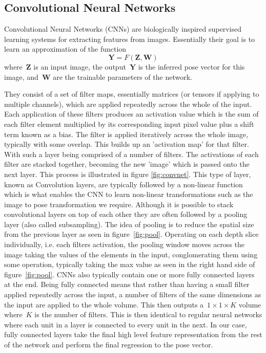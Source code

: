 \documentclass[11pt]{article} %
\begin{document}


\subsection{Convolutional Neural Networks}

Convolutional Neural Networks (CNNs) are biologically inspired supervised learning systems for extracting features from images. Essentially their goal is to learn an approximation of the function
\begin{equation}
\boldsymbol{Y} = F(\boldsymbol{Z},\boldsymbol{W})
\label{eq:networkF}
\end{equation}
where~$\boldsymbol{Z}$ is an input image, the output~$\boldsymbol{Y}$ is the inferred pose vector for this image, and~$\boldsymbol{W}$ are the trainable parameters of the network. 
 
They consist of a set of filter maps, essentially matrices (or tensors if applying to multiple channels), which are applied repeatedly across the whole of the input. Each application of these filters produces an activation value which is the sum of each filter element multiplied by its corresponding input pixel value plus a shift term known as a bias. The filter is applied iteratively across the whole image, typically with some overlap. This builds up an 'activation map' for that filter. With such a layer being comprised of a number of filters. The activations of each filter are stacked together, becoming the new 'image' which is passed onto the next layer. This process is illustrated in figure \ref{fig:convnet}. This type of layer, known as Convolution layers, are typically followed by a non-linear function which is what enables the CNN to learn non-linear transformations such as the image to pose transformation we require. Although it is possible to stack convolutional layers on top of each other they are often followed by a pooling layer (also called subsampling). The idea of pooling is to reduce the spatial size from the previous layer as seen in figure~\ref{fig:pool}. Operating on each depth slice individually, i.e. each filters activation, the pooling window moves across the image taking the values of the elements in the input, conglomerating them using some operation, typically taking the max value as seen in the right hand side of figure~\ref{fig:pool}. CNNs also typically contain one or more fully connected layers at the end. Being fully connected means that rather than having a small filter applied repeatedly across the input, a number of filters of the same dimensions as the input are applied to the whole volume. This then outputs a~$1\times 1 \times K$ volume where~$K$ is the number of filters. This is then identical to regular neural networks where each unit in a layer is connected to every unit in the next. In our case, fully connected layers take the final high level feature representation from the rest of the network and perform the final regression to the pose vector. 
\end{document}
